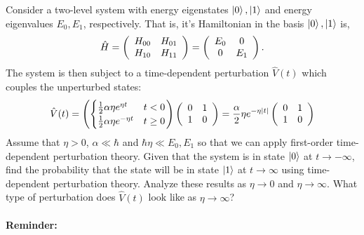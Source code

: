 \documentclass[10pt]{article}
\newcommand{\1}{\mathbf 1}
\begin{document}
Consider a two-level system with energy eigenstates $\ket{0},\ket{1}$ and energy eigenvalues $E_0,E_1$, respectively.
That is, it's Hamiltonian in the basis $\ket{0},\ket{1}$ is,
\begin{align}
	\hat H
	=
	\left(
		\begin{array}[]{cc}
			H_{00} & H_{01}\\
			H_{10} & H_{11}\\
		\end{array}
	\right)
	=
	\left(
		\begin{array}[]{cc}
			E_0 & 0\\
			0 & E_1\\
		\end{array}
	\right).
\end{align}
The system is then subject to a time-dependent perturbation $\hat V(t)$ which couples the unperturbed states:
\begin{align}
	\hat V(t)
	=
	\left(\begin{cases}
		\frac{1}{2}\alpha \eta e^{\eta t} & t <0\\
		\frac{1}{2}\alpha \eta e^{-\eta t} & t \geq 0\\
	\end{cases}
	\right)
	\left(
		\begin{array}[]{cc}
			0 & 1\\
			1 & 0\\
		\end{array}
	\right)
	=
	\frac{\alpha}{2}\eta e^{-\eta|t|}
	\left(
		\begin{array}[]{cc}
			0 & 1\\
			1 & 0\\
		\end{array}
	\right)
\end{align}
Assume that $\eta>0$, $\alpha \ll \hbar$ and $\hbar \eta \ll E_0,E_1$ so that we can apply first-order time-dependent perturbation theory.
Given that the system is in state $\ket{0}$ at $t \to -\infty$, find the probability that the state will be in state $\ket{1}$ at $t \to \infty$ using time-dependent perturbation theory.
Analyze these results as $\eta \to 0$ and $\eta \to \infty$.
What type of perturbation does $\hat V(t)$ look like as $\eta \to \infty$?

\paragraph{Reminder:}
\end{document}
